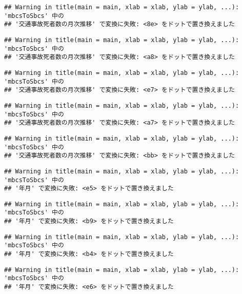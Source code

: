 \documentclass[]{article}
\begin{document}
\begin{verbatim}
## Warning in title(main = main, xlab = xlab, ylab = ylab, ...): 'mbcsToSbcs' 中の
## '交通事故死者数の月次推移' で変換に失敗: <8e> をドットで置き換えました
\end{verbatim}

\begin{verbatim}
## Warning in title(main = main, xlab = xlab, ylab = ylab, ...): 'mbcsToSbcs' 中の
## '交通事故死者数の月次推移' で変換に失敗: <a8> をドットで置き換えました
\end{verbatim}

\begin{verbatim}
## Warning in title(main = main, xlab = xlab, ylab = ylab, ...): 'mbcsToSbcs' 中の
## '交通事故死者数の月次推移' で変換に失敗: <e7> をドットで置き換えました
\end{verbatim}

\begin{verbatim}
## Warning in title(main = main, xlab = xlab, ylab = ylab, ...): 'mbcsToSbcs' 中の
## '交通事故死者数の月次推移' で変換に失敗: <a7> をドットで置き換えました
\end{verbatim}

\begin{verbatim}
## Warning in title(main = main, xlab = xlab, ylab = ylab, ...): 'mbcsToSbcs' 中の
## '交通事故死者数の月次推移' で変換に失敗: <bb> をドットで置き換えました
\end{verbatim}

\begin{verbatim}
## Warning in title(main = main, xlab = xlab, ylab = ylab, ...): 'mbcsToSbcs' 中の
## '年月' で変換に失敗: <e5> をドットで置き換えました
\end{verbatim}

\begin{verbatim}
## Warning in title(main = main, xlab = xlab, ylab = ylab, ...): 'mbcsToSbcs' 中の
## '年月' で変換に失敗: <b9> をドットで置き換えました
\end{verbatim}

\begin{verbatim}
## Warning in title(main = main, xlab = xlab, ylab = ylab, ...): 'mbcsToSbcs' 中の
## '年月' で変換に失敗: <b4> をドットで置き換えました
\end{verbatim}

\begin{verbatim}
## Warning in title(main = main, xlab = xlab, ylab = ylab, ...): 'mbcsToSbcs' 中の
## '年月' で変換に失敗: <e6> をドットで置き換えました
\end{verbatim}
\end{document}
